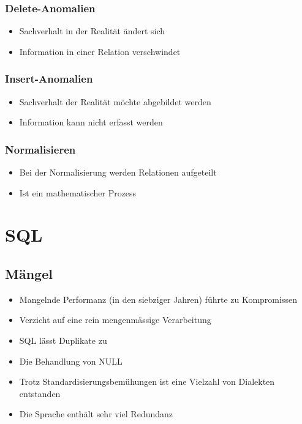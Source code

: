 \documentclass[8pt,a4paper]{scrartcl}
\begin{document}
\begin{multicols*}{3}
				\subsubsection{Delete-Anomalien}
					\begin{itemize}\itemsep0pt		
						\item Sachverhalt in der Realität ändert sich
						\item Information in einer Relation verschwindet
					\end{itemize}
				\subsubsection{Insert-Anomalien}
					\begin{itemize}\itemsep0pt		
						\item Sachverhalt der Realität möchte abgebildet werden
						\item Information kann nicht erfasst werden
					\end{itemize}
				\subsubsection{Normalisieren}
					\begin{itemize}\itemsep0pt		
						\item Bei der Normalisierung werden Relationen aufgeteilt
						\item Ist ein mathematischer Prozess
					\end{itemize}
		
		\section{SQL}
			\subsection{Mängel}
				\begin{itemize}\itemsep0pt		
					\item Mangelnde Performanz (in den siebziger Jahren) führte zu Kompromissen
					\item Verzicht auf eine rein mengenmässige Verarbeitung
					\item SQL lässt Duplikate zu
					\item Die Behandlung von NULL
					\item Trotz Standardisierungsbemühungen ist eine Vielzahl von Dialekten entstanden
					\item Die Sprache enthält sehr viel Redundanz
				\end{itemize}
				

\end{multicols*}
\end{document}
